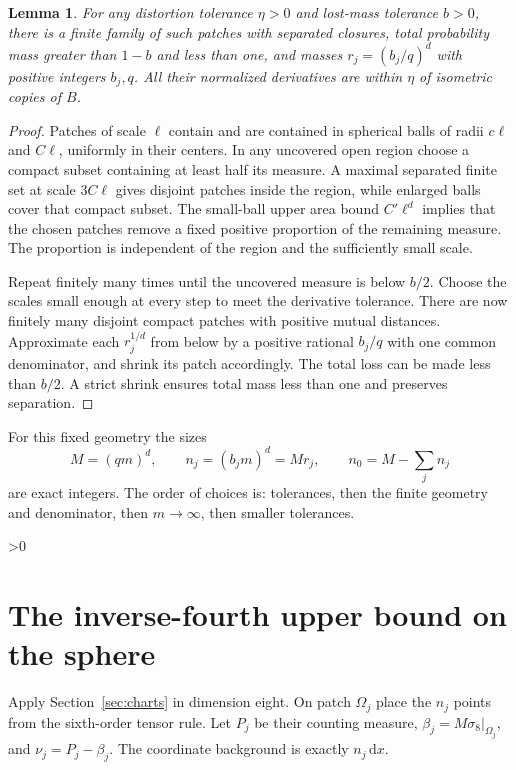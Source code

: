 \documentclass[11pt,a4paper]{article}
\newtheorem{lemma}[theorem]{Lemma}
\theoremstyle{definition}
\newcommand{\dd}{\,\mathrm d}
\numberwithin{equation}{section}
\let\originalsection\section
\renewcommand{\section}{\ifnum\value{section}>0\clearpage\fi\originalsection}
\begin{document}
\begin{lemma}\label{lem:rationalpatches}
For any distortion tolerance $\eta>0$ and lost-mass tolerance $b>0$, there is a finite family of such patches with separated closures, total probability mass greater than $1-b$ and less than one, and masses $r_j=(b_j/q)^d$ with positive integers $b_j,q$. All their normalized derivatives are within $\eta$ of isometric copies of $B$.
\end{lemma}
\begin{proof}
Patches of scale $\ell$ contain and are contained in spherical balls of radii $c\ell$ and $C\ell$, uniformly in their centers. In any uncovered open region choose a compact subset containing at least half its measure. A maximal separated finite set at scale $3C\ell$ gives disjoint patches inside the region, while enlarged balls cover that compact subset. The small-ball upper area bound $C'\ell^d$ implies that the chosen patches remove a fixed positive proportion of the remaining measure. The proportion is independent of the region and the sufficiently small scale.

Repeat finitely many times until the uncovered measure is below $b/2$. Choose the scales small enough at every step to meet the derivative tolerance. There are now finitely many disjoint compact patches with positive mutual distances. Approximate each $r_j^{1/d}$ from below by a positive rational $b_j/q$ with one common denominator, and shrink its patch accordingly. The total loss can be made less than $b/2$. A strict shrink ensures total mass less than one and preserves separation.
\end{proof}
For this fixed geometry the sizes
\begin{equation}\label{eq:rationalsizes}
 M=(qm)^d,\qquad n_j=(b_jm)^d=Mr_j,\qquad
 n_0=M-\sum_jn_j
\end{equation}
are exact integers. The order of choices is: tolerances, then the finite geometry and denominator, then $m\to\infty$, then smaller tolerances.

\section{The inverse-fourth upper bound on the sphere}\label{sec:upperfour}
Apply Section~\ref{sec:charts} in dimension eight. On patch $\Omega_j$ place the $n_j$ points from the sixth-order tensor rule. Let $P_j$ be their counting measure, $\beta_j=M\sigma_8|_{\Omega_j}$, and $\nu_j=P_j-\beta_j$. The coordinate background is exactly $n_j\dd x$.
\end{document}
